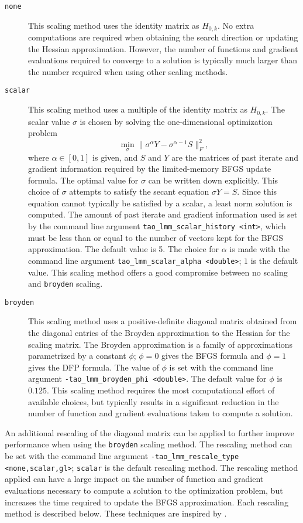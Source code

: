 \begin{description}
\item[{\tt none}]  This scaling method uses the identity matrix as 
$H_{0,k}$.  No extra computations are required when obtaining the 
search direction or updating the Hessian approximation.  However, 
the number of functions and gradient evaluations required to converge
to a solution is typically much larger than the number required when 
using other scaling methods.
\item[{\tt scalar}]  This scaling method uses a multiple of the identity 
matrix as $H_{0,k}$.  The scalar value $\sigma$ is chosen by solving the 
one-dimensional optimization problem
\[
\min_\sigma \|\sigma^\alpha Y - \sigma^{\alpha - 1} S\|_F^2,
\]
where $\alpha \in [0,1]$ is given, and $S$ and $Y$ are the matrices of 
past iterate and gradient information required by the limited-memory
BFGS update formula.  The optimal value for $\sigma$ can be written
down explicitly.  This choice of $\sigma$ attempts to satisfy the 
secant equation $\sigma Y = S$.  Since this equation cannot typically
be satisfied by a scalar, a least norm solution is computed.  The amount 
of past iterate and gradient information used is set by the command line 
argument {\tt tao\_lmm\_scalar\_history <int>}, which must be less than 
or equal to the number of vectors kept for the BFGS approximation.  
The default value is 5.  The choice for $\alpha$ is made with the command 
line argument {\tt tao\_lmm\_scalar\_alpha <double>}; $1$ is the default
value.  This scaling method offers a good compromise between no scaling 
and {\tt broyden} scaling.
\item[{\tt broyden}] This scaling method uses a positive-definite diagonal 
matrix obtained from the diagonal entries of the Broyden approximation to 
the Hessian for the scaling matrix.  The Broyden approximation is a 
family of approximations parametrized by a constant $\phi$; $\phi = 0$ 
gives the BFGS formula and $\phi = 1$ gives the DFP formula.  The value 
of $\phi$ is set with the command line argument 
{\tt -tao\_lmm\_broyden\_phi <double>}.  The default value for $\phi$ 
is $0.125$.  This scaling method requires the most computational effort 
of available choices, but typically results in a significant reduction 
in the number of function and gradient evaluations taken to compute a 
solution.
\end{description}

An additional rescaling of the diagonal matrix can be applied to further
improve performance when using the {\tt broyden} scaling method.  The
rescaling method can be set with the command line argument 
{\tt -tao\_lmm\_rescale\_type <none,scalar,gl>}; {\tt scalar} is the 
default rescaling method.  The rescaling method applied can have a large 
impact on the number of function and gradient evaluations necessary to 
compute a solution to the optimization problem, but increases the time
required to update the BFGS approximation.  Each rescaling method is 
described below.  These techniques are inspired by \cite{Gilbert-Lemarechal}.

